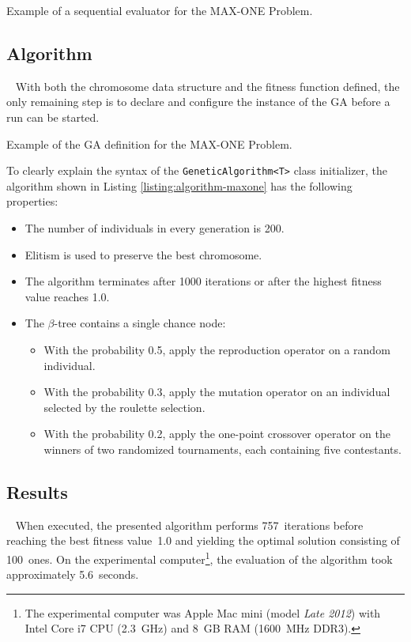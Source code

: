 \begin{listing}[ht]
	\caption{Example of a sequential evaluator for the MAX-ONE Problem.}
	\label{listing:evaluator-sequential-maxone}
\end{listing}

\subsection{Algorithm}~\label{section:maxone-algorithm}
With both the chromosome data structure and the fitness function defined, the only remaining step is to declare and configure the instance of the GA before a run can be started. 

\begin{listing}[ht]
	\caption{Example of the GA definition for the MAX-ONE Problem.}
	\label{listing:algorithm-maxone}
\end{listing}

To clearly explain the syntax of the \texttt{GeneticAlgorithm<T>} class initializer, the algorithm shown in Listing \ref{listing:algorithm-maxone} has the following properties:
~
\begin{itemize}
	\item The number of individuals in every generation is 200.
	\item Elitism is used to preserve the best chromosome.
	\item The algorithm terminates after 1000 iterations or after the highest fitness value reaches 1.0.
	\item The $\beta$-tree contains a single chance node:
	~
	\begin{itemize}
		\item With the probability 0.5, apply the reproduction operator on a random individual.
		\item With the probability 0.3, apply the mutation operator on an individual selected by the roulette selection.
		\item With the probability 0.2, apply the one-point crossover operator on the winners of two randomized tournaments, each containing five contestants.
	\end{itemize}
\end{itemize}

\subsection{Results}~\label{section:maxone-results}
When executed, the presented algorithm performs 757~iterations before reaching the best fitness value~1.0 and yielding the optimal solution consisting of 100~ones. On the experimental computer\footnote{The experimental computer was Apple Mac mini (model \textit{Late 2012}) with Intel Core i7 CPU (2.3~GHz) and 8~GB RAM (1600~MHz DDR3).}, the evaluation of the algorithm took approximately 5.6~seconds.

